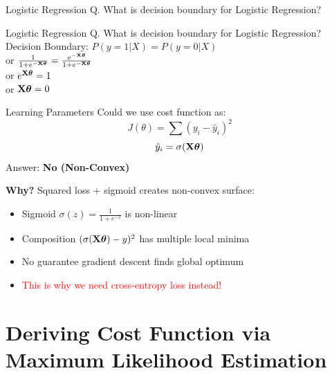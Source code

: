 \documentclass{beamer}
\begin{document}
\begin{frame}{Logistic Regression}
Q. What is decision boundary for Logistic Regression?
\end{frame}
\begin{frame}{Logistic Regression}
Q. What is decision boundary for Logistic Regression? \\
\hspace{0.4cm} Decision Boundary: $P(y = 1|X) = P(y = 0 | X)$\\
\vspace{0.3cm}
\hspace{4cm} or $\frac{1}{1 + e^{-\mathbf{X}\boldsymbol{\theta}}} = \frac{e^{-\mathbf{X}\boldsymbol{\theta}}}{1 + e^{-\mathbf{X}\boldsymbol{\theta}}}$  \\
\vspace{0.3cm}
\hspace{4cm} or $e^{\mathbf{X}\boldsymbol{\theta}} = 1$\\
\vspace{0.3cm}
\hspace{4cm} or $\mathbf{X}\boldsymbol{\theta} = 0$
\end{frame}
\begin{frame}{Learning Parameters}
Could we use cost function as:
\begin{equation*}
J(\theta) = \sum (y_{i} - \hat{y}_{i})^{2}
\end{equation*}
\begin{equation*}
\hat{y}_{i} = \sigma(\mathbf{X}\boldsymbol{\theta})
\end{equation*}
Answer: \textbf{No (Non-Convex)}

\pause
\textbf{Why?} Squared loss + sigmoid creates non-convex surface:
\begin{itemize}[<+->]
\item Sigmoid $\sigma(z) = \frac{1}{1+e^{-z}}$ is non-linear
\item Composition $(\sigma(\mathbf{X}\boldsymbol{\theta}) - y)^2$ has multiple local minima
\item No guarantee gradient descent finds global optimum
\item \textcolor{red}{This is why we need cross-entropy loss instead!}
\end{itemize}
\end{frame}


\section{Deriving Cost Function via Maximum Likelihood Estimation}
\end{document}
